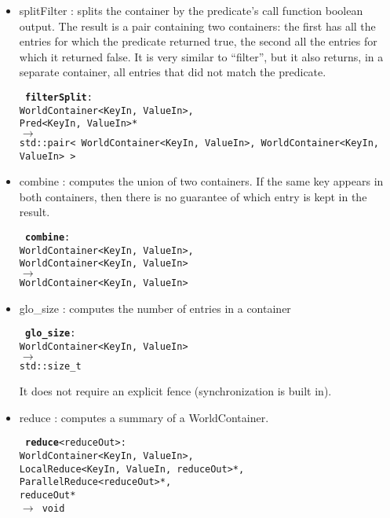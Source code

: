 \documentclass{article}
\begin{document}
\begin{itemize}
  \item splitFilter : splits the container by the predicate's call function
boolean output.  The result is a pair containing two containers: the first
has all the entries for which the predicate returned true, the second all the
entries for which it returned false. It is very similar to ``filter'', but
it also returns, in a separate container, all entries that did not match
the predicate.

    {\tt
    {\bf filterSplit}:\\
    WorldContainer<KeyIn, ValueIn>,\\
    Pred<KeyIn, ValueIn>*\\
    $\rightarrow$\\
    std::pair< WorldContainer<KeyIn, ValueIn>, WorldContainer<KeyIn, ValueIn> >\\
    }

  \item combine : computes the union of two containers.
    If the same key appears in both containers, then there is no guarantee of
which entry is kept in the result.

    {\tt
    {\bf combine}:\\
    WorldContainer<KeyIn, ValueIn>,\\
    WorldContainer<KeyIn, ValueIn>\\
    $\rightarrow$\\
    WorldContainer<KeyIn, ValueIn>\\
    }

  \item glo\_size : computes the number of entries in a container

    {\tt
    {\bf glo\_size}:\\
    WorldContainer<KeyIn, ValueIn>\\
    $\rightarrow$\\
    std::size\_t\\
    }

    It does not require an explicit fence (synchronization is built in).

  \item reduce : computes a summary of a WorldContainer.

     {\tt
     {\bf reduce}<reduceOut>:\\
     WorldContainer<KeyIn, ValueIn>,\\
     LocalReduce<KeyIn, ValueIn, reduceOut>*,\\
     ParallelReduce<reduceOut>*,\\
     reduceOut*\\
     $\rightarrow$  
     void\\
     }


\end{itemize}
\end{document}
